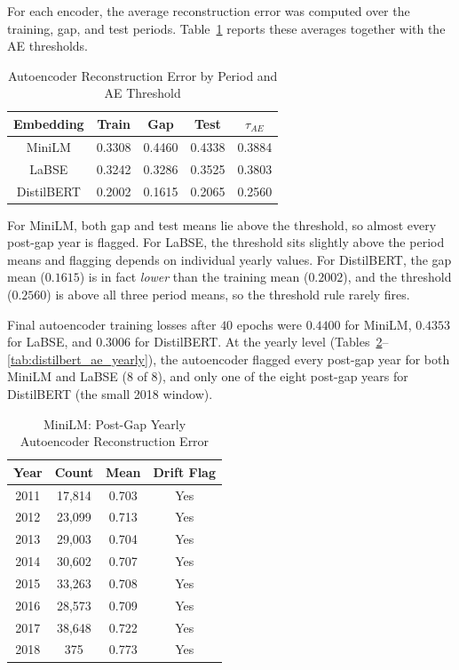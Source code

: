 \documentclass[conference]{IEEEtran}
\begin{document}
For each encoder, the average reconstruction error was computed over the training, gap, and test periods. Table~\ref{tab:ae_period_summary} reports these averages together with the AE thresholds.

\begin{table}[htbp]
\caption{Autoencoder Reconstruction Error by Period and AE Threshold}
\label{tab:ae_period_summary}
\begin{center}
\begin{tabular}{|c|c|c|c|c|}
\hline
\textbf{Embedding} & \textbf{Train} & \textbf{Gap} & \textbf{Test} & \textbf{$\tau_{AE}$} \\
\hline
MiniLM & 0.3308 & 0.4460 & 0.4338 & 0.3884 \\
LaBSE & 0.3242 & 0.3286 & 0.3525 & 0.3803 \\
DistilBERT & 0.2002 & 0.1615 & 0.2065 & 0.2560 \\
\hline
\end{tabular}
\end{center}
\end{table}

For MiniLM, both gap and test means lie above the threshold, so almost every post-gap year is flagged. For LaBSE, the threshold sits slightly above the period means and flagging depends on individual yearly values. For DistilBERT, the gap mean ($0.1615$) is in fact \emph{lower} than the training mean ($0.2002$), and the threshold ($0.2560$) is above all three period means, so the threshold rule rarely fires.

Final autoencoder training losses after $40$ epochs were $0.4400$ for MiniLM, $0.4353$ for LaBSE, and $0.3006$ for DistilBERT. At the yearly level (Tables~\ref{tab:minilm_ae_yearly}--\ref{tab:distilbert_ae_yearly}), the autoencoder flagged every post-gap year for both MiniLM and LaBSE (8 of 8), and only one of the eight post-gap years for DistilBERT (the small 2018 window).

\begin{table}[htbp]
\caption{MiniLM: Post-Gap Yearly Autoencoder Reconstruction Error}
\label{tab:minilm_ae_yearly}
\begin{center}
\begin{tabular}{|c|c|c|c|}
\hline
\textbf{Year} & \textbf{Count} & \textbf{Mean} & \textbf{Drift Flag} \\
\hline
2011 & 17{,}814 & 0.703 & Yes \\
2012 & 23{,}099 & 0.713 & Yes \\
2013 & 29{,}003 & 0.704 & Yes \\
2014 & 30{,}602 & 0.707 & Yes \\
2015 & 33{,}263 & 0.708 & Yes \\
2016 & 28{,}573 & 0.709 & Yes \\
2017 & 38{,}648 & 0.722 & Yes \\
2018 & 375    & 0.773 & Yes \\
\hline
\end{tabular}
\end{center}
\end{table}
\end{document}
